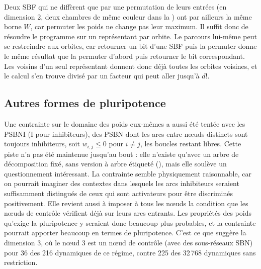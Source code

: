 \documentclass[12pt, a4paper]{article}
\begin{document}
Deux SBF qui ne diffèrent que par une permutation de leurs entrées (en dimension 2, deux chambres de même couleur dans la ) ont par ailleurs la même borne $W$, car permuter les poids ne change pas leur maximum.
Il suffit donc de résoudre le programme sur un représentant par orbite.
Le parcours lui-même peut se restreindre aux orbites, car retourner un bit d'une SBF puis la permuter donne le même résultat que la permuter d'abord puis retourner le bit correspondant.
Les voisins d'un seul représentant donnent donc déjà toutes les orbites voisines, et le calcul s'en trouve divisé par un facteur qui peut aller jusqu'à $d!$.


\subsection{Autres formes de pluripotence}
\label{ann:autres-formes}

Une contrainte sur le domaine des poids eux-mêmes a aussi été tentée avec les PSBNI (I pour inhibiteurs), des PSBN dont les arcs entre nœuds distincts sont toujours inhibiteurs, soit $w_{i,j} \le 0$ pour $i \neq j$, les boucles restant libres.
Cette piste n'a pas été maintenue jusqu'au bout : elle n'existe qu'avec un arbre de décomposition fixé, sans version à arbre étiqueté (), mais elle soulève un questionnement intéressant.
La contrainte semble physiquement raisonnable, car on pourrait imaginer des contextes dans lesquels les arcs inhibiteurs seraient suffisamment distingués de ceux qui sont activateurs pour être discriminés positivement.
Elle revient aussi à imposer à tous les nœuds la condition que les nœuds de contrôle vérifient déjà sur leurs arcs entrants.
Les propriétés des poids qu'exige la pluripotence y seraient donc beaucoup plus probables, et la contrainte pourrait apporter beaucoup en termes de pluripotence.
C'est ce que suggère la dimension 3, où le nœud 3 est un nœud de contrôle (avec des sous-réseaux SBN) pour 36 des 216 dynamiques de ce régime, contre 225 des 32\,768 dynamiques sans restriction.
\end{document}
